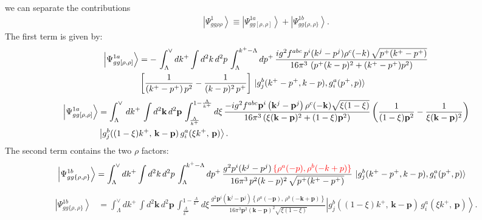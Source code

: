 \documentclass[aps,prd,amsmath,amssymb,nofootinbib]{revtex4-2}
\numberwithin{equation}{section}
\begin{document}
we can separate the contributions
\begin{align}
\left|\Psi_{gg\rho\rho}^{1}\right\rangle \equiv \left|\Psi_{gg[\rho,\rho]}^{1a}\right\rangle + \left|\Psi_{gg\{\rho,\rho\}}^{1b}\right\rangle.
\end{align}
The first term is given by:
\begin{align}
    \left|\Psi_{gg[\rho,\rho]}^{1a}\right\rangle &= -\,\int_{\Lambda}^{\vee} dk^{+} \int d^{2}k\, d^{2}p\, \int_{\Lambda}^{k^{+}-\Lambda}dp^{+}\, \frac{ig^{2}f^{abc}\,p^{i}(k^{j}-p^{j})\rho^{c}(-k)\, \sqrt{p^{+}(k^{+}-p^{+})}}{16\pi^{3}\, \left(p^{+}(k-p)^{2}+(k^{+}-p^{+})p^{2}\right)}\notag \\ &  \left[\frac{1}{(k^{+}-p^{+})\,p^{2}} - \frac{1}{(k-p)^{2}\,p^{+}}\right]\, \ket{g^{b}_{j}(k^{+}-p^{+}, k-p),g^{a}_{i}(p^{+},p)}
\end{align}
\begin{align}\label{part 1}
\left|\Psi_{gg[\rho,\rho]}^{1a}\right\rangle &=\int_{\Lambda}^{\vee}\, dk^{+}\,\int d^{2}\mathbf{k}\, d^{2}\mathbf{p}\,\int_{\frac{\Lambda}{k^{+}}}^{1-\frac{\Lambda}{k^{+}}}d\xi\,\frac{-ig^{2}f^{abc}\mathbf{p}^{i}\left(\mathbf{k}^{j}-\mathbf{p}^{j}\right)\rho^{c}(-\mathbf{k})\sqrt{\xi(1-\xi)}}{16\pi^{3}\left(\xi(\mathbf{k}-\mathbf{p})^{2}+(1-\xi)\mathbf{p}^{2}\right)} \left(\frac{1}{(1-\xi)\mathbf{p}^{2}}-\frac{1}{\xi(\mathbf{k}-\mathbf{p})^{2}}\right)\notag \\ & \left|g_{j}^{b}((1-\xi)k^{+},\,\mathbf{k}-\mathbf{p})\,g_{i}^{a}(\xi k^{+},\,\mathbf{p})\right\rangle.
\end{align}
The second term contains the two $\rho$ factors:
\begin{align}
    \left|\Psi_{gg\{\rho,\rho\}}^{1b}\right\rangle & =  \int_{\Lambda}^{\vee} dk^{+} \int d^{2}k\, d^{2}p\, \int_{\Lambda}^{k^{+}-\Lambda}dp^{+}\, \frac{g^{2}p^{i}(k^{j}-p^{j})\,{\color{red}\{\rho^{a}(-p),\rho^{b}(-k+p)\}}}{16\pi^{3}\,p^{2}(k-p)^{2}\, \sqrt{p^{+}(k^{+}-p^{+})}}\, \ket{g^{b}_{j}(k^{+}-p^{+}, k-p),g^{a}_{i}(p^{+},p)}
\end{align}
\begin{align}\label{part 2}
\left|\Psi_{gg\{\rho,\rho\}}^{1b}\right\rangle &= \int_{\Lambda}^{\vee}dk^{+}\,\int d^{2}\mathbf{k}\, d^{2}\mathbf{p}\,\int_{\frac{\Lambda}{k^{+}}}^{1-\frac{\Lambda}{k^{+}}}d\xi\,\frac{g^{2}\mathbf{p}^{i}\left(\mathbf{k}^{j}-\mathbf{p}^{j}\right)\left\{ \rho^{a}(-\mathbf{p}),\,\rho^{b}(-\mathbf{k}+\mathbf{p})\right\} }{16\pi^{3}\mathbf{p}^{2}(\mathbf{k}-\mathbf{p})^{2}\sqrt{\xi(1-\xi)}}  \left|g_{j}^{b}((1-\xi)k^{+},\,\mathbf{k}-\mathbf{p})\,g_{i}^{a}(\xi k^{+},\,\mathbf{p})\right\rangle.
\end{align}
\end{document}
